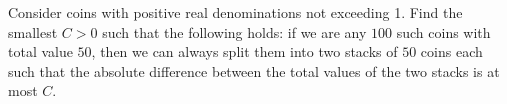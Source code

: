 Consider coins with positive real denominations not exceeding 1. Find the smallest $C>0$ such that the following holds: if we are any $100$ such coins with total value $50$, then we can always split them into two stacks of $50$ coins each such that the absolute difference between the total values of the two stacks is at most $C$.